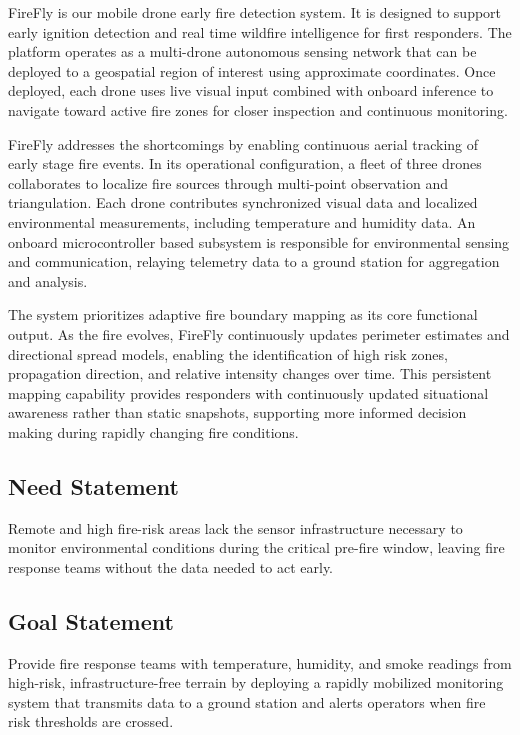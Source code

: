 \documentclass[journal, onecolumn]{IEEEtran}
\begin{document}
FireFly is our mobile drone early fire detection system. It is designed to support early ignition detection and real time wildfire
intelligence for first responders. The platform operates as a multi-drone autonomous sensing network that can be deployed to
a geospatial region of interest using approximate coordinates. Once deployed, each drone uses live visual input combined with
onboard inference to navigate toward active fire zones for closer inspection and continuous monitoring.

FireFly addresses the shortcomings by enabling continuous aerial tracking of early stage fire events. In its operational
configuration, a fleet of three drones collaborates to localize fire sources through multi-point observation and triangulation. Each
drone contributes synchronized visual data and localized environmental measurements, including temperature and humidity data. 
An onboard microcontroller based subsystem is responsible for environmental sensing and communication, relaying telemetry 
data to a ground station for aggregation and analysis.

The system prioritizes adaptive fire boundary mapping as its core functional output. As the fire evolves, FireFly continuously
updates perimeter estimates and directional spread models, enabling the identification of high risk zones, propagation direction,
and relative intensity changes over time. This persistent mapping capability provides responders with continuously updated
situational awareness rather than static snapshots, supporting more informed decision making during rapidly changing fire
conditions.

\subsection{Need Statement}
Remote and high fire-risk areas lack the sensor infrastructure necessary to monitor environmental conditions during the critical pre-fire window, leaving fire response teams without the data needed to act early.

\subsection{Goal Statement}
Provide fire response teams with temperature, humidity, and smoke readings from high-risk, infrastructure-free terrain by deploying a rapidly mobilized monitoring system that transmits data to a ground station and alerts operators when fire risk thresholds are crossed.
\end{document}

